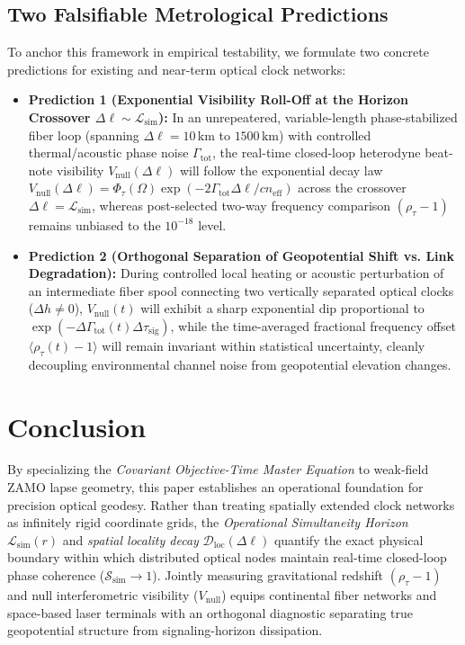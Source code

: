 \documentclass[11pt,a4paper]{article}
\begin{document}
\subsection{Two Falsifiable Metrological Predictions}

To anchor this framework in empirical testability, we formulate two concrete predictions for existing and near-term optical clock networks:
\begin{itemize}[leftmargin=1.6em]
    \item \textbf{Prediction 1 (Exponential Visibility Roll-Off at the Horizon Crossover $\Delta\ell \sim \mathcal{L}_{\mathrm{sim}}$):} In an unrepeatered, variable-length phase-stabilized fiber loop (spanning $\Delta\ell = 10\,\mathrm{km}$ to $1500\,\mathrm{km}$) with controlled thermal/acoustic phase noise $\Gamma_{\mathrm{tot}}$, the real-time closed-loop heterodyne beat-note visibility $V_{\mathrm{null}}(\Delta\ell)$ will follow the exponential decay law $V_{\mathrm{null}}(\Delta\ell) = \Phi_\tau(\Omega)\exp(-2\Gamma_{\mathrm{tot}}\Delta\ell / c n_{\mathrm{eff}})$ across the crossover $\Delta\ell = \mathcal{L}_{\mathrm{sim}}$, whereas post-selected two-way frequency comparison $(\rho_\tau - 1)$ remains unbiased to the $10^{-18}$ level.
    \item \textbf{Prediction 2 (Orthogonal Separation of Geopotential Shift vs. Link Degradation):} During controlled local heating or acoustic perturbation of an intermediate fiber spool connecting two vertically separated optical clocks ($\Delta h \neq 0$), $V_{\mathrm{null}}(t)$ will exhibit a sharp exponential dip proportional to $\exp(-\Delta\Gamma_{\mathrm{tot}}(t)\Delta\tau_{\mathrm{sig}})$, while the time-averaged fractional frequency offset $\langle \rho_\tau(t) - 1 \rangle$ will remain invariant within statistical uncertainty, cleanly decoupling environmental channel noise from geopotential elevation changes.
\end{itemize}

\section{Conclusion}

By specializing the \emph{Covariant Objective-Time Master Equation} to weak-field ZAMO lapse geometry, this paper establishes an operational foundation for precision optical geodesy. Rather than treating spatially extended clock networks as infinitely rigid coordinate grids, the \emph{Operational Simultaneity Horizon} $\mathcal{L}_{\mathrm{sim}}(r)$ and \emph{spatial locality decay} $\mathcal{D}_{\mathrm{loc}}(\Delta\ell)$ quantify the exact physical boundary within which distributed optical nodes maintain real-time closed-loop phase coherence ($\mathcal{S}_{\mathrm{sim}} \to 1$). Jointly measuring gravitational redshift $(\rho_\tau - 1)$ and null interferometric visibility ($V_{\mathrm{null}}$) equips continental fiber networks and space-based laser terminals with an orthogonal diagnostic separating true geopotential structure from signaling-horizon dissipation.
\end{document}
